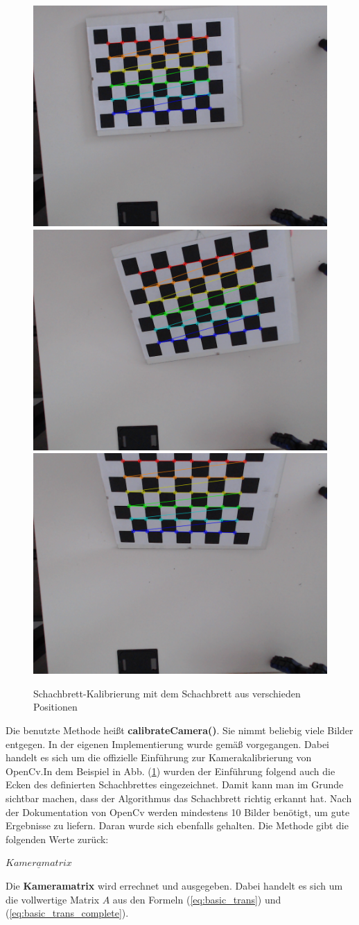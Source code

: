 		\begin{figure}[h]
			\centering
			\includegraphics[width=0.32\linewidth]{img/hauptteil/calibration/chessboard_corner_0.png}
			\includegraphics[width=0.32\linewidth]{img/hauptteil/calibration/chessboard_corner_1.png}
			\includegraphics[width=0.32\linewidth]{img/hauptteil/calibration/chessboard_corner_2.png}
			\caption[Schachbrett-Kalibrierung]{Schachbrett-Kalibrierung mit dem Schachbrett aus verschieden Positionen}
			\label{fig:chessboards}
		\end{figure}
	
		Die benutzte Methode heißt \textbf{calibrateCamera()}. Sie nimmt beliebig viele Bilder entgegen. In der eigenen Implementierung wurde gemäß \citep[vgl.][]{noauthor_opencv_nodate-1} vorgegangen. Dabei handelt es sich um die offizielle Einführung zur Kamerakalibrierung von OpenCv.In dem Beispiel in Abb. (\ref{fig:chessboards}) wurden der Einführung folgend auch die Ecken des definierten Schachbrettes eingezeichnet. Damit kann man im Grunde sichtbar machen, dass der Algorithmus das Schachbrett richtig erkannt hat. Nach der Dokumentation von OpenCv \citep[vgl.][]{noauthor_opencv_nodate-1} werden mindestens 10 Bilder benötigt, um gute Ergebnisse zu liefern. Daran wurde sich ebenfalls gehalten. Die Methode gibt die folgenden Werte zurück:
		
		$\underline{Kameramatrix}$
		
		Die \textbf{Kameramatrix} wird errechnet und ausgegeben. Dabei handelt es sich um die vollwertige Matrix \( A \) aus den Formeln (\ref{eq:basic_trans}) und (\ref{eq:basic_trans_complete}).
		
